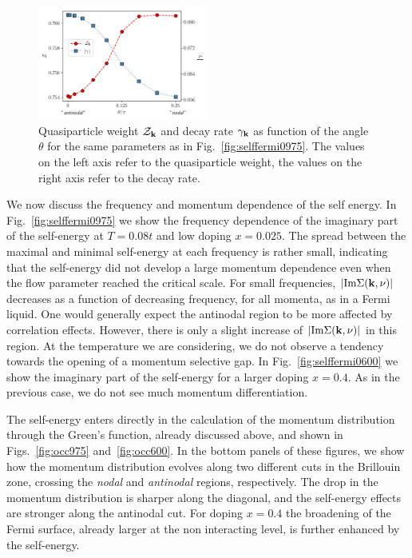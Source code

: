 \begin{figure}
\includegraphics[width=0.5\textwidth]{images/z_and_gamma975.png}
\caption{Quasiparticle weight $\mathcal{Z}_{\mathbf{k} }$ and decay rate $\gamma_{\bf{k}}$ as function of the angle $\theta$ for the same parameters as in Fig.~\ref{fig:selffermi0975}. 
The values on the left axis refer to the quasiparticle weight, the values on the right axis refer to the decay rate.}
\label{fig:zetaandgamma}
\end{figure}

We now discuss the frequency and momentum dependence of the self energy. 
In Fig.~\ref{fig:selffermi0975}  we show the frequency dependence of the imaginary part of the self-energy at $T=0.08t$ and low doping $x=0.025$. 
The spread between the maximal and minimal self-energy at each frequency is rather small, indicating that the self-energy did not develop a large momentum dependence even when the flow parameter reached the critical scale. 
For small frequencies, $|\mathrm{Im}\Sigma(\mathbf{k},\nu)|$ decreases as a function of decreasing frequency, for all momenta, as in a Fermi liquid. 
One would generally expect the antinodal region to be more affected by correlation effects. However, there is only a slight increase of $|\mathrm{Im}\Sigma(\mathbf{k},\nu)|$ in this region. At the temperature we are considering, we do not observe a tendency towards the opening of a momentum selective gap. 
In Fig.~\ref{fig:selffermi0600} we show the imaginary part of the self-energy for a larger doping $x=0.4$. As in the previous case, we do not see much momentum differentiation.

The self-energy enters directly in the calculation of the momentum distribution through the Green's function, already discussed above, and shown in Figs.~\ref{fig:occ975} and~\ref{fig:occ600}.
In the bottom panels of these figures, we show how the momentum distribution evolves along two different cuts in the Brillouin zone, crossing the \textit{nodal} and \textit{antinodal} regions, respectively.
The drop in the momentum distribution is sharper along the diagonal, and the self-energy effects are stronger along the antinodal cut.
For doping $x=0.4$ the broadening of the Fermi surface, already larger at the non interacting level, is further enhanced by the self-energy.

